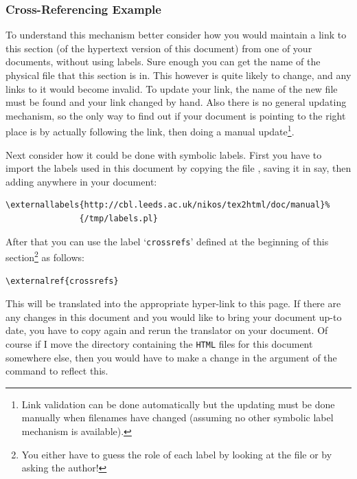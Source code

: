 

\subsubsection{Cross-Referencing Example\label{crossrefs}}%
To understand this mechanism better consider 
how you would maintain a link to this section  
(of the hypertext version of this document) from one of your documents,
without using labels.
Sure enough you can get the name of the physical file that this section is in. 
This however is quite likely to change, and any links to it would become invalid. 
%
To update your link, the name of the new file must be found 
and your link changed by hand. 
Also there is no general updating mechanism, so the only way to find
out if your document is pointing to the right place is by actually
following the link, then doing a manual update\footnote{%
Link validation can be done automatically but the updating must be done
manually when filenames have changed (assuming no other symbolic label
mechanism is available).}.

\html{\\}%
Next consider how it could be done with symbolic labels. 
First you have to import the labels used in this document 
by copying the file ,
saving it in  say,
then adding anywhere in your document:
\begin{small}
\begin{verbatim}
\externallabels{http://cbl.leeds.ac.uk/nikos/tex2html/doc/manual}%
               {/tmp/labels.pl}
\end{verbatim}
\end{small}
After that you can use the label `\texttt{crossrefs}' defined at the beginning of this 
section\footnote{You either have to guess the role of each label by
looking at the  file or by asking the author!} as follows:
\begin{small}
\begin{verbatim}
\externalref{crossrefs}
\end{verbatim}
\end{small}
This will be translated into the appropriate hyper-link to this page.
If there are any changes in this document and you would like to
bring your document up-to date, you have to copy 
 again
and rerun the translator on your document. Of course if I move the 
directory containing the \texttt{HTML} files for this document somewhere else, 
then you would have to make a change in the argument of the 
 command to reflect this. 

